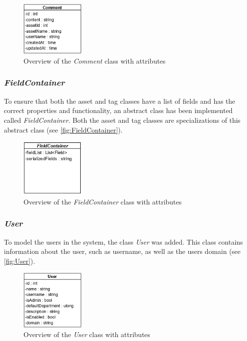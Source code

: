 \begin{figure}[H]
    \centering
    \includegraphics[width=0.28\textwidth]{figures/Classes/CommentAttributes.png}
    \caption{Overview of the \textit{Comment} class with attributes}
    \label{fig:CommentWithAttributes}
\end{figure}


\subsubsection{\textit{FieldContainer}}
To ensure that both the asset and tag classes have a list of fields and has the correct properties and functionality, an abstract class has been implemented called \textit{FieldContainer}. Both the asset and tag classes are specializations of this abstract class (see \autoref{fig:FieldContainer}).

\begin{figure}[H]
    \centering
    \includegraphics[width=0.28\textwidth]{figures/Classes/FieldContainer.png}
    \caption{Overview of the \textit{FieldContainer} class with attributes}
    \label{fig:FieldContainer}
\end{figure}


\subsubsection{\textit{User}}
To model the users in the system, the class \textit{User} was added. This class contains information about the user, such as username, as well as the users domain (see \autoref{fig:User}).

\begin{figure}[H]
    \centering
    \includegraphics[width=0.28\textwidth]{figures/Classes/User.png}
    \caption{Overview of the \textit{User} class with attributes}
    \label{fig:User}
\end{figure}

